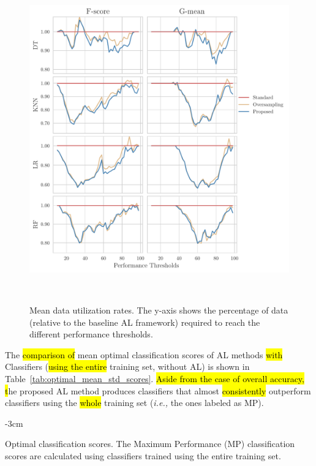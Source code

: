 \documentclass[preprint, 12pt]{elsarticle}
\begin{document}
\begin{figure}
	\centering
	\includegraphics[width=1\linewidth]{../analysis/data_utilization_rate}
    \caption{%
        Mean data utilization rates. The y-axis shows the percentage of data
        (relative to the baseline AL framework) required to reach the
        different performance thresholds.
    }~\label{fig:dur}
\end{figure}

The \hl{comparison of} mean optimal classification scores of AL methods
\hl{with} Classifiers (\hl{using the entire} training set, without AL)
is shown in Table~\ref{tab:optimal_mean_std_scores}. \hl{Aside from the case of
overall accuracy, t}he proposed AL method
produces classifiers that almost \hl{consistently} outperform classifiers
using the \hl{whole} training set (\textit{i.e.,} the ones labeled as MP).

\begin{table}
    \centering
    \addtolength{\leftskip} {-3cm}
    \addtolength{\rightskip}{-3cm}
    \caption{\label{tab:optimal_mean_std_scores}
        Optimal classification scores. The Maximum Performance (MP)
        classification scores are calculated using classifiers trained using
        the entire training set.
    }
\end{table}
\end{document}
